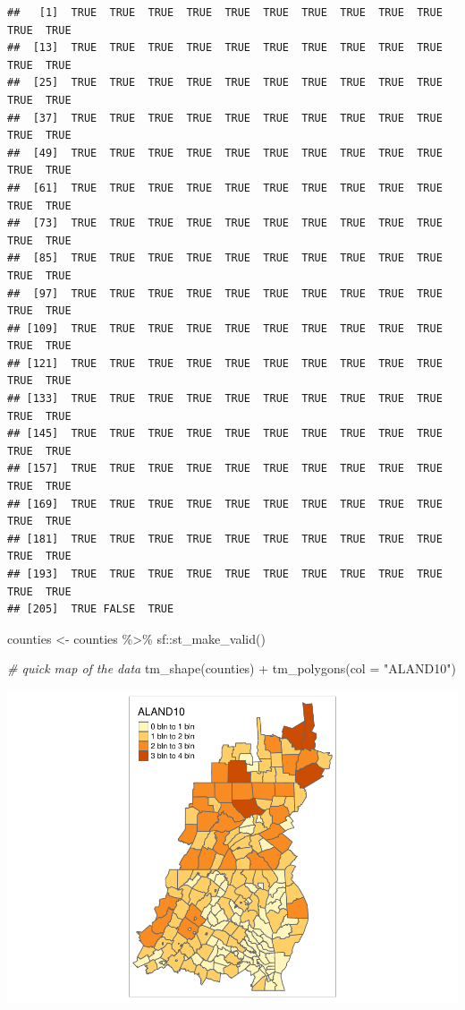 \documentclass[]{article}
\newenvironment{Shaded}{\begin{snugshade}}{\end{snugshade}}
\newcommand{\AttributeTok}[1]{\textcolor[rgb]{0.77,0.63,0.00}{#1}}
\newcommand{\CommentTok}[1]{\textcolor[rgb]{0.56,0.35,0.01}{\textit{#1}}}
\newcommand{\FunctionTok}[1]{\textcolor[rgb]{0.00,0.00,0.00}{#1}}
\newcommand{\NormalTok}[1]{#1}
\newcommand{\OtherTok}[1]{\textcolor[rgb]{0.56,0.35,0.01}{#1}}
\newcommand{\SpecialCharTok}[1]{\textcolor[rgb]{0.00,0.00,0.00}{#1}}
\newcommand{\StringTok}[1]{\textcolor[rgb]{0.31,0.60,0.02}{#1}}
\begin{document}
\begin{verbatim}
##   [1]  TRUE  TRUE  TRUE  TRUE  TRUE  TRUE  TRUE  TRUE  TRUE  TRUE  TRUE  TRUE
##  [13]  TRUE  TRUE  TRUE  TRUE  TRUE  TRUE  TRUE  TRUE  TRUE  TRUE  TRUE  TRUE
##  [25]  TRUE  TRUE  TRUE  TRUE  TRUE  TRUE  TRUE  TRUE  TRUE  TRUE  TRUE  TRUE
##  [37]  TRUE  TRUE  TRUE  TRUE  TRUE  TRUE  TRUE  TRUE  TRUE  TRUE  TRUE  TRUE
##  [49]  TRUE  TRUE  TRUE  TRUE  TRUE  TRUE  TRUE  TRUE  TRUE  TRUE  TRUE  TRUE
##  [61]  TRUE  TRUE  TRUE  TRUE  TRUE  TRUE  TRUE  TRUE  TRUE  TRUE  TRUE  TRUE
##  [73]  TRUE  TRUE  TRUE  TRUE  TRUE  TRUE  TRUE  TRUE  TRUE  TRUE  TRUE  TRUE
##  [85]  TRUE  TRUE  TRUE  TRUE  TRUE  TRUE  TRUE  TRUE  TRUE  TRUE  TRUE  TRUE
##  [97]  TRUE  TRUE  TRUE  TRUE  TRUE  TRUE  TRUE  TRUE  TRUE  TRUE  TRUE  TRUE
## [109]  TRUE  TRUE  TRUE  TRUE  TRUE  TRUE  TRUE  TRUE  TRUE  TRUE  TRUE  TRUE
## [121]  TRUE  TRUE  TRUE  TRUE  TRUE  TRUE  TRUE  TRUE  TRUE  TRUE  TRUE  TRUE
## [133]  TRUE  TRUE  TRUE  TRUE  TRUE  TRUE  TRUE  TRUE  TRUE  TRUE  TRUE  TRUE
## [145]  TRUE  TRUE  TRUE  TRUE  TRUE  TRUE  TRUE  TRUE  TRUE  TRUE  TRUE  TRUE
## [157]  TRUE  TRUE  TRUE  TRUE  TRUE  TRUE  TRUE  TRUE  TRUE  TRUE  TRUE  TRUE
## [169]  TRUE  TRUE  TRUE  TRUE  TRUE  TRUE  TRUE  TRUE  TRUE  TRUE  TRUE  TRUE
## [181]  TRUE  TRUE  TRUE  TRUE  TRUE  TRUE  TRUE  TRUE  TRUE  TRUE  TRUE  TRUE
## [193]  TRUE  TRUE  TRUE  TRUE  TRUE  TRUE  TRUE  TRUE  TRUE  TRUE  TRUE  TRUE
## [205]  TRUE FALSE  TRUE
\end{verbatim}

\begin{Shaded}
\begin{Highlighting}[]
\NormalTok{counties }\OtherTok{\textless{}{-}}\NormalTok{ counties }\SpecialCharTok{\%\textgreater{}\%}\NormalTok{ sf}\SpecialCharTok{::}\FunctionTok{st\_make\_valid}\NormalTok{()}

\CommentTok{\# quick map of the data}
\FunctionTok{tm\_shape}\NormalTok{(counties) }\SpecialCharTok{+} \FunctionTok{tm\_polygons}\NormalTok{(}\AttributeTok{col =} \StringTok{"ALAND10"}\NormalTok{)}
\end{Highlighting}
\end{Shaded}

\includegraphics{lab02_files/figure-latex/remembering tmap-1.pdf}
\end{document}
